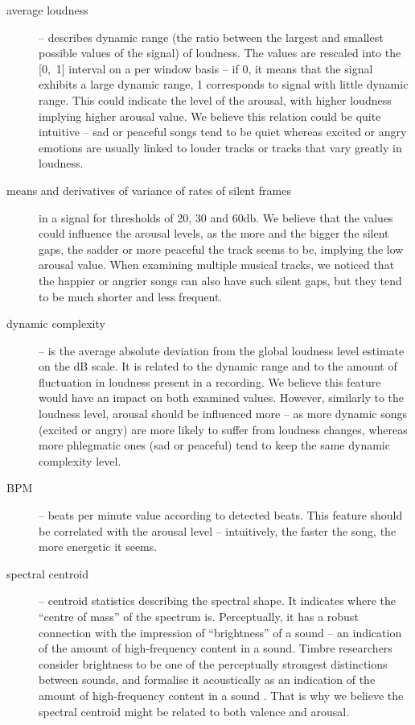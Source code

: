 \begin{description}

\item[average loudness] -- describes dynamic range (the ratio between the largest and smallest possible values of the signal) of loudness. The values are rescaled into the [0,~1] interval on a per window basis -- if 0, it means that the signal exhibits a large dynamic range, 1 corresponds to signal with little dynamic range. This could indicate the level of the arousal, with higher loudness implying higher arousal value. We believe this relation could be quite intuitive -- sad or peaceful songs tend to be quiet whereas excited or angry emotions are usually linked to louder tracks or tracks that vary greatly in loudness.

\item[means and derivatives of variance of rates of silent frames] in a signal for thresholds of 20, 30 and 60db. We believe that the values could influence the arousal levels, as the more and the bigger the silent gaps, the sadder or more peaceful the track seems to be, implying the low arousal value. When examining multiple musical tracks, we noticed that the happier or angrier songs can also have such silent gaps, but they tend to be much shorter and less frequent.

\item[dynamic complexity] -- is the average absolute deviation from the global loudness level estimate on the dB scale. It is related to the dynamic range and to the amount of fluctuation in loudness present in a recording. We believe this feature would have an impact on both examined values. However, similarly to the loudness level, arousal should be influenced more -- as more dynamic songs (excited or angry) are more likely to suffer from loudness changes, whereas more phlegmatic ones (sad or peaceful) tend to keep the same dynamic complexity level.

\item[BPM] -- beats per minute value according to detected beats. This feature should be correlated with the arousal level -- intuitively, the faster the song, the more energetic it seems. 

\item[spectral centroid] -- centroid statistics describing the spectral shape. It indicates where the ``centre of mass'' of the spectrum is. Perceptually, it has a robust connection with the impression of ``brightness'' of a sound -- an indication of the amount of high-frequency content in a sound. Timbre researchers consider brightness to be one of the perceptually strongest distinctions between sounds, and formalise it acoustically as an indication of the amount of high-frequency content in a sound \cite{timber}. That is why we believe the spectral centroid might be related to both valence and arousal.


\end{description}
